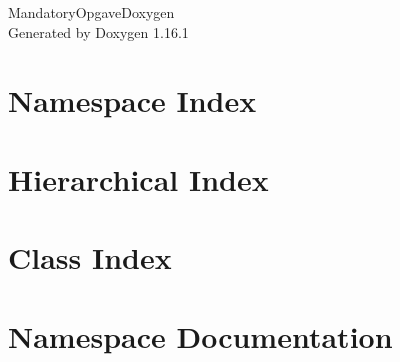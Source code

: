\documentclass[twoside]{book}
\newcommand{\+}{\discretionary{\mbox{\scriptsize$\hookleftarrow$}}{}{}}
\newcommand{\clearemptydoublepage}{%
    \newpage{\pagestyle{empty}\cleardoublepage}%
  }
\begin{document}
  \raggedbottom
    \hypersetup{pageanchor=false,
                bookmarksnumbered=true,
                pdfencoding=unicode
               }
  \begin{titlepage}
  \vspace*{7cm}
  \begin{center}%
  {\Large Mandatory\+Opgave\+Doxygen}\\
  \vspace*{1cm}
  {\large Generated by Doxygen 1.16.1}\\
  \end{center}
  \end{titlepage}
  \clearemptydoublepage
  \tableofcontents
  \clearemptydoublepage
  \hypersetup{pageanchor=true}
\chapter{Namespace Index}

\chapter{Hierarchical Index}

\chapter{Class Index}

\chapter{Namespace Documentation}












\end{document}
